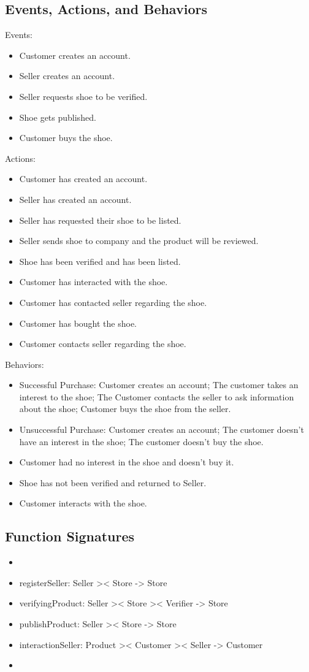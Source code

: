 \subsection{Events, Actions, and Behaviors}
Events:
\begin{itemize}
  \item Customer creates an account.
  \item Seller creates an account.
  \item Seller requests shoe to be verified.
  \item Shoe gets published.
  \item Customer buys the shoe.
\end{itemize}
Actions:
\begin{itemize}
  \item Customer has created an account.
  \item Seller has created an account.
  \item Seller has requested their shoe to be listed.
  \item Seller sends shoe to company and the product will be reviewed.
  \item Shoe has been verified and has been listed.
  \item Customer has interacted with the shoe.
  \item Customer has contacted seller regarding the shoe.
  \item Customer has bought the shoe.
  \item Customer contacts seller regarding the shoe.
\end{itemize}
Behaviors:
\begin{itemize}
  \item Successful Purchase: Customer creates an account; The customer takes an interest to the shoe; The Customer contacts the seller to ask information about the shoe; Customer buys the shoe from the seller.
  \item Unsuccessful Purchase: Customer creates an account; The customer doesn't have an interest in the shoe; The customer doesn't buy the shoe.
  \item Customer had no interest in the shoe and doesn't buy it.
  \item Shoe has not been verified and returned to Seller.
  \item Customer interacts with the shoe.
\end{itemize}
\subsection{Function Signatures}
\begin{itemize}
  \item {}
  \item registerSeller: Seller >< Store -> Store
  \item verifyingProduct: Seller >< Store >< Verifier -> Store
  \item publishProduct: Seller >< Store -> Store
  \item interactionSeller: Product >< Customer >< Seller -> Customer
  \item {}
\end{itemize}
